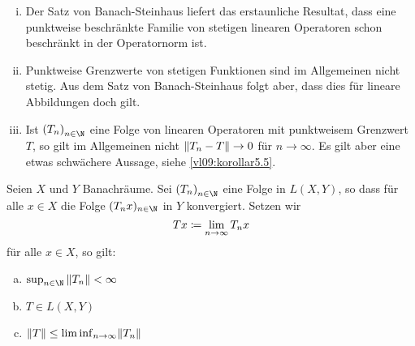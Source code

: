 \begin{thBemerkung}\hfill
    \begin{enumerate}[(i)]
        \item
            Der Satz von Banach-Steinhaus 
            liefert das erstaunliche Resultat, dass eine punktweise beschränkte
            Familie von stetigen linearen Operatoren schon beschränkt in der
            Operatornorm ist.
            
        \item
            Punktweise Grenzwerte von stetigen Funktionen sind im Allgemeinen
            nicht stetig. Aus dem Satz von Banach-Steinhaus
             folgt aber, dass dies für lineare
            Abbildungen doch gilt.
            
        \item
            Ist $\nSeq T$ eine Folge von linearen Operatoren mit punktweisem
            Grenzwert $T$, so gilt im Allgemeinen nicht 
            $\lVert T_n-T\rVert\to0$ für $n\to\infty$. Es gilt aber eine etwas
            schwächere Aussage, siehe \cref{vl09:korollar5.5}.
    \end{enumerate}
\end{thBemerkung}

\begin{thKorollar} \label{vl09:korollar5.5}
    Seien $X$ und $Y$ Banachräume. Sei $\nSeq T$ eine Folge in $L(X,Y)$, so dass
    für alle $x\in X$ die Folge $(T_n x)_{n\in\N}$ in $Y$ konvergiert. Setzen wir
    \[ Tx \coloneqq \lim_{n\to\infty} T_n x  \]
    für alle $x\in X$, so gilt:
    \begin{enumerate}[(a),leftmargin=1.3cm]
        \item \label{vl09:korollar5.5:a}
            $\sup_{n\in\N} \, \norm{T_n} < \infty$
            
        \item \label{vl09:korollar5.5:b}
            $T\in L(X,Y)$
            
        \item \label{vl09:korollar5.5:c}
            $\lVert T\rVert \leq \liminf_{n\to\infty} \lVert T_n\rVert$
    \end{enumerate}
\end{thKorollar}

